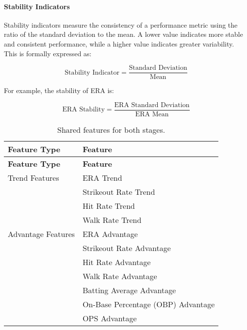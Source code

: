 \documentclass[12pt,a4paper]{article}
\begin{document}
\paragraph{\textbf{Stability Indicators}}
Stability indicators measure the consistency of a performance metric using the ratio of the standard deviation to the mean. A lower value indicates more stable and consistent performance, while a higher value indicates greater variability. This is formally expressed as:

\[
\text{Stability Indicator} = \frac{\text{Standard Deviation}}{\text{Mean}}
\]

For example, the stability of ERA is:

\[
\text{ERA Stability} = \frac{\text{ERA Standard Deviation}}{\text{ERA Mean}}
\]

\small
\begin{longtable}{p{} p{}}
\toprule
\textbf{Feature Type}          & \textbf{Feature}                            \\
\midrule
\endfirsthead
\toprule
\textbf{Feature Type}          & \textbf{Feature}                            \\
\midrule
\endhead
\bottomrule
\endfoot
\bottomrule
\caption{Shared features for both stages.} %
\label{tab:shared_features}
\endlastfoot
Trend Features                 & ERA Trend                                   \\
                                & Strikeout Rate Trend                        \\
                                & Hit Rate Trend                              \\
                                & Walk Rate Trend                             \\
Advantage Features             & ERA Advantage                              \\
                                & Strikeout Rate Advantage                    \\
                                & Hit Rate Advantage                          \\
                                & Walk Rate Advantage                         \\
                                & Batting Average Advantage                   \\
                                & On-Base Percentage (OBP) Advantage          \\
                                & OPS Advantage                               \\

\end{longtable}
\end{document}
